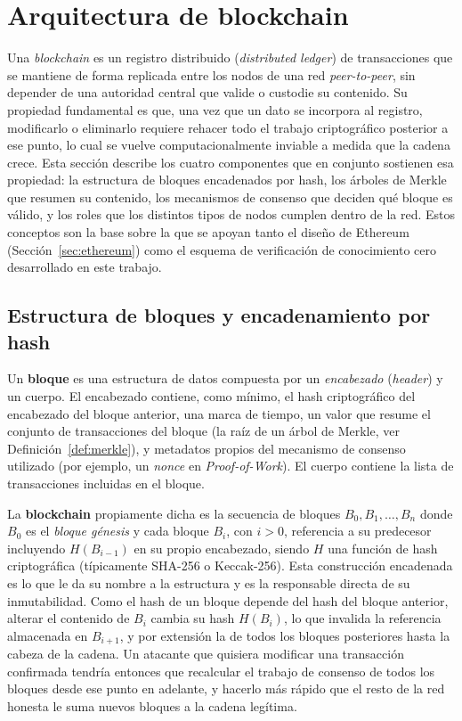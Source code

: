 \section{Arquitectura de blockchain}
\label{sec:arquitectura_blockchain}

Una \textit{blockchain} es un registro distribuido (\textit{distributed ledger}) de
transacciones que se mantiene de forma replicada entre los nodos de una red \textit{peer-to-peer},
sin depender de una autoridad central que valide o custodie su contenido. Su propiedad
fundamental es que, una vez que un dato se incorpora al registro, modificarlo o eliminarlo
requiere rehacer todo el trabajo criptográfico posterior a ese punto, lo cual se vuelve
computacionalmente inviable a medida que la cadena crece. Esta sección describe los cuatro
componentes que en conjunto sostienen esa propiedad: la estructura de bloques encadenados por
hash, los árboles de Merkle que resumen su contenido, los mecanismos de consenso que deciden
qué bloque es válido, y los roles que los distintos tipos de nodos cumplen dentro de la red.
Estos conceptos son la base sobre la que se apoyan tanto el diseño de Ethereum
(Sección~\ref{sec:ethereum}) como el esquema de verificación de conocimiento cero desarrollado
en este trabajo.

\subsection{Estructura de bloques y encadenamiento por hash}

\begin{definition}
	Un \textbf{bloque} es una estructura de datos compuesta por un \textit{encabezado}
	(\textit{header}) y un cuerpo. El encabezado contiene, como mínimo, el hash criptográfico
	del encabezado del bloque anterior, una marca de tiempo, un valor que resume el conjunto de
	transacciones del bloque (la raíz de un árbol de Merkle, ver Definición~\ref{def:merkle}), y
	metadatos propios del mecanismo de consenso utilizado (por ejemplo, un \textit{nonce} en
	\textit{Proof-of-Work}). El cuerpo contiene la lista de transacciones incluidas en el bloque.
\end{definition}

La \textbf{blockchain} propiamente dicha es la secuencia de bloques $B_0, B_1, \dots, B_n$
donde $B_0$ es el \textit{bloque génesis} y cada bloque $B_i$, con $i > 0$, referencia a su
predecesor incluyendo $H(B_{i-1})$ en su propio encabezado, siendo $H$ una función de hash
criptográfica (típicamente SHA-256 o Keccak-256). Esta construcción encadenada es lo que le da
su nombre a la estructura y es la responsable directa de su inmutabilidad. Como el hash de un
bloque depende del hash del bloque anterior, alterar el contenido de $B_i$ cambia su hash
$H(B_i)$, lo que invalida la referencia almacenada en $B_{i+1}$, y por extensión la de todos
los bloques posteriores hasta la cabeza de la cadena. Un atacante que quisiera modificar una
transacción confirmada tendría entonces que recalcular el trabajo de consenso de todos los
bloques desde ese punto en adelante, y hacerlo más rápido que el resto de la red honesta le
suma nuevos bloques a la cadena legítima.

